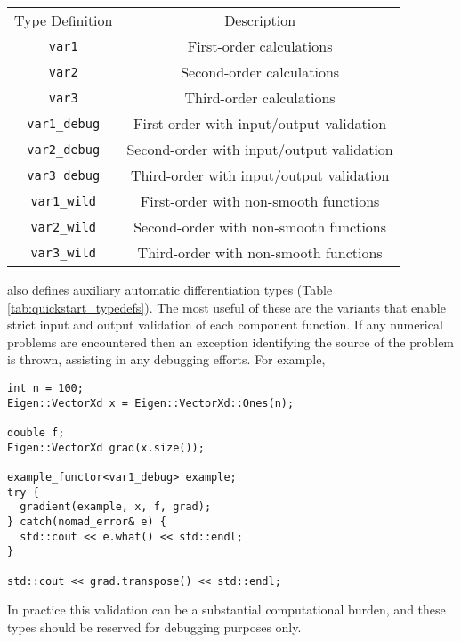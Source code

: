 \begin{table*}[t!]
	\centering
	\renewcommand{\arraystretch}{2}
	\begin{tabular}{cc}
	\rowcolor[gray]{0.9} Type Definition & Description \\
	\verb|var1| & First-order calculations \\
	\rowcolor[gray]{0.9} \verb|var2| & Second-order calculations \\
	\verb|var3| & Third-order calculations \\
	\rowcolor[gray]{0.9} \verb|var1_debug| & First-order with input/output validation \\
	\verb|var2_debug| & Second-order with input/output validation \\
	\rowcolor[gray]{0.9} \verb|var3_debug| & Third-order with input/output validation  \\
	\verb|var1_wild| & First-order with non-smooth functions \\
	\rowcolor[gray]{0.9} \verb|var2_wild| & Second-order with non-smooth functions \\
	\verb|var3_wild| & Third-order with non-smooth functions \\
	\end{tabular}
	\label{tab:quickstart_typedefs}
	\caption{\nomad defines a variety of automatic differentiation variables, including
	variants that enable input/output validation and the use of non-smooth functions.}
\end{table*}

\nomad also defines auxiliary automatic differentiation types 
(Table \ref{tab:quickstart_typedefs}).  The most useful of these are the  
variants that enable strict input and output validation of each component function.  
If any numerical problems are encountered then an exception identifying the source 
of the problem is thrown, assisting in any debugging efforts.  For example,
%
\begin{verbatim}
int n = 100;
Eigen::VectorXd x = Eigen::VectorXd::Ones(n);
  
double f;
Eigen::VectorXd grad(x.size());
  
example_functor<var1_debug> example;
try {
  gradient(example, x, f, grad);
} catch(nomad_error& e) {
  std::cout << e.what() << std::endl;
}

std::cout << grad.transpose() << std::endl;
\end{verbatim}
%
In practice this validation can be a substantial computational burden,
and these types should be reserved for debugging purposes only.

